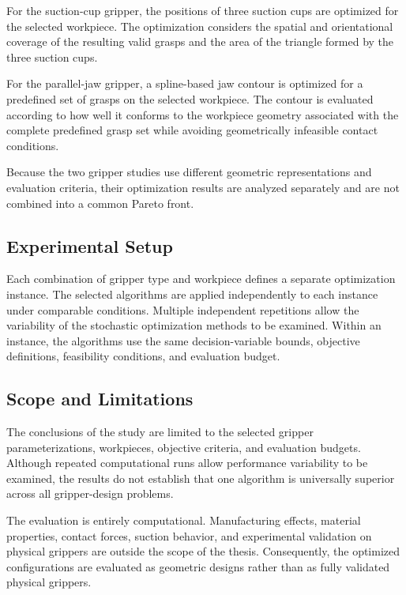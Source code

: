For the suction-cup gripper, the positions of three suction cups are optimized for the selected workpiece. The optimization considers the spatial and
orientational coverage of the resulting valid grasps and the area of the triangle formed by the three suction cups.

For the parallel-jaw gripper, a spline-based jaw contour is optimized for a predefined set of grasps on the selected workpiece. The contour is
evaluated according to how well it conforms to the workpiece geometry associated with the complete predefined grasp set while avoiding geometrically
infeasible contact conditions.

Because the two gripper studies use different geometric representations and evaluation criteria, their optimization results are analyzed separately
and are not combined into a common Pareto front.

\subsection{Experimental Setup}
\label{subsec:experimental_setup}

Each combination of gripper type and workpiece defines a separate optimization instance. The selected algorithms are applied independently to each
instance under comparable conditions. Multiple independent repetitions allow the variability of the stochastic optimization methods to be examined.
Within an instance, the algorithms use the same decision-variable bounds, objective definitions, feasibility conditions, and evaluation budget.

\subsection{Scope and Limitations}
\label{subsec:scope_limitations}

The conclusions of the study are limited to the selected gripper parameterizations, workpieces, objective criteria, and evaluation budgets. Although
repeated computational runs allow performance variability to be examined, the results do not establish that one algorithm is universally superior
across all gripper-design problems.

The evaluation is entirely computational. Manufacturing effects, material properties, contact forces, suction behavior, and experimental validation on
physical grippers are outside the scope of the thesis. Consequently, the optimized configurations are evaluated as geometric designs rather than as
fully validated physical grippers.

